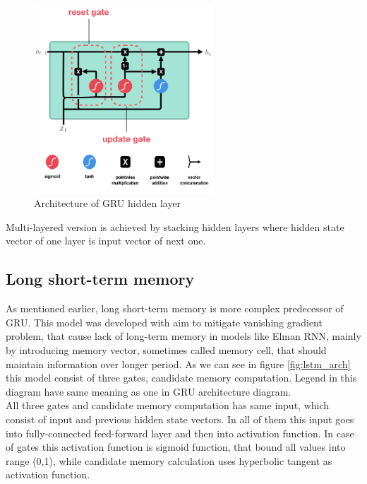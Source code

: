 \begin{figure}[!h]
	\centering
	
	\includegraphics[width=0.6\textwidth]{images/GRU_arch.png}
	
	\caption{Architecture of GRU hidden layer}
	\label{fig:gru_arch}
\end{figure}
 
Multi-layered version is achieved by stacking hidden layers where hidden state vector of one layer is input vector of next one.
 
\subsection{Long short-term memory}

As mentioned earlier, long short-term memory is more complex predecessor of GRU. This model was developed with aim to mitigate vanishing gradient problem, that cause lack of long-term memory in models like Elman RNN, mainly by introducing memory vector, sometimes called memory cell, that should maintain information over longer period. As we can see in figure \ref{fig:lstm_arch} this model consist of three gates, candidate memory computation. Legend in this diagram have same meaning as one in GRU architecture diagram.
\\

All three gates and candidate memory computation has same input, which consist of input and previous hidden state vectors. In all of them this input goes into fully-connected feed-forward layer and then into activation function. In case of gates this activation function is sigmoid function, that bound all values into range (0,1), while candidate memory calculation uses hyperbolic tangent as activation function.
\\ 

